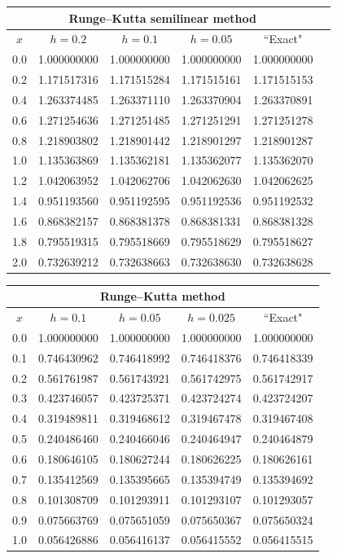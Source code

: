 \documentclass[dvips]{book}
\renewcommand{\exer}[1]{\par\medskip\;\noindent{\color{red}\bf #1.}}
\numberwithin{example}{section}
\numberwithin{equation}{section}
\numberwithin{theorem}{section}
\numberwithin{table}{section}
\numberwithin{figure}{section}
\begin{document}
{\small
\begin{tabular}{|c|r|r|r|r|r|}
\hline
\multicolumn{5}{|c|}{Runge--Kutta semilinear method}\\\hline
\multicolumn{1}{|c|}{$x$}&
\multicolumn{1}{|c|}{$h=0.2$}&
\multicolumn{1}{|c|}{$h=0.1$}&
\multicolumn{1}{|c|}{$h=0.05$}&
\multicolumn{1}{|c|}{``Exact"}\\ \hline
0.0 & 1.000000000 & 1.000000000 & 1.000000000 & 1.000000000 \\
0.2 & 1.171517316 & 1.171515284 & 1.171515161 & 1.171515153 \\
0.4 & 1.263374485 & 1.263371110 & 1.263370904 & 1.263370891 \\
0.6 & 1.271254636 & 1.271251485 & 1.271251291 & 1.271251278 \\
0.8 & 1.218903802 & 1.218901442 & 1.218901297 & 1.218901287 \\
1.0 & 1.135363869 & 1.135362181 & 1.135362077 & 1.135362070 \\
1.2 & 1.042063952 & 1.042062706 & 1.042062630 & 1.042062625 \\
1.4 & 0.951193560 & 0.951192595 & 0.951192536 & 0.951192532 \\
1.6 & 0.868382157 & 0.868381378 & 0.868381331 & 0.868381328 \\
1.8 & 0.795519315 & 0.795518669 & 0.795518629 & 0.795518627 \\
2.0 & 0.732639212 & 0.732638663 & 0.732638630 & 0.732638628 \\
\hline
\end{tabular}}


\exer{3.3.20}
{\small
\begin{tabular}{|c|r|r|r|r|}
\hline
\multicolumn{5}{|c|}{Runge--Kutta method}\\\hline
\multicolumn{1}{|c|}{$x$}&
\multicolumn{1}{|c|}{$h=0.1$}&
\multicolumn{1}{|c|}{$h=0.05$}&
\multicolumn{1}{|c|}{$h=0.025$}&
\multicolumn{1}{|c|}{``Exact"}\\ \hline
0.0 & 1.000000000 & 1.000000000 & 1.000000000 & 1.000000000 \\
0.1 & 0.746430962 & 0.746418992 & 0.746418376 & 0.746418339 \\
0.2 & 0.561761987 & 0.561743921 & 0.561742975 & 0.561742917 \\
0.3 & 0.423746057 & 0.423725371 & 0.423724274 & 0.423724207 \\
0.4 & 0.319489811 & 0.319468612 & 0.319467478 & 0.319467408 \\
0.5 & 0.240486460 & 0.240466046 & 0.240464947 & 0.240464879 \\
0.6 & 0.180646105 & 0.180627244 & 0.180626225 & 0.180626161 \\
0.7 & 0.135412569 & 0.135395665 & 0.135394749 & 0.135394692 \\
0.8 & 0.101308709 & 0.101293911 & 0.101293107 & 0.101293057 \\
0.9 & 0.075663769 & 0.075651059 & 0.075650367 & 0.075650324 \\
1.0 & 0.056426886 & 0.056416137 & 0.056415552 & 0.056415515 \\
\hline
\end{tabular}}
\medskip
\end{document}
